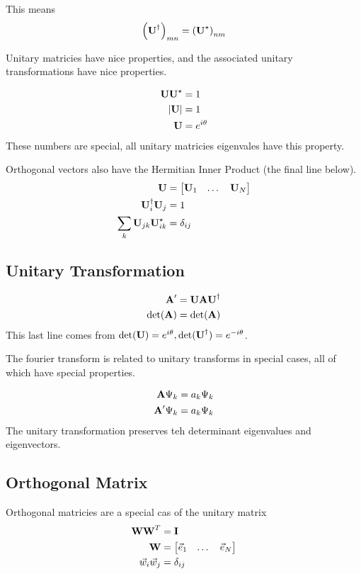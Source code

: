 \documentclass{article}
\newcommand{\be}{\begin{equation}}
\newcommand{\ee}{\end{equation}}
\newcommand{\dg}{\dagger}
\newcommand{\bA}{\mbox{\bf A}}
\newcommand{\bI}{\mbox{\bf I}}
\newcommand{\bU}{\mbox{\bf U}}
\newcommand{\bW}{\mbox{\bf W}}
\begin{document}
This means
\be
\left(\bU^\dg\right)_{mn} = \left(\bU^\star\right)_{nm}
\ee

Unitary matricies have nice properties, and the associated unitary transformations have nice properties. 

\be
\begin{split}
    \bU\bU^\star &= 1\\
    |\bU| &= 1\\
    \bU &= e^{i\theta}
\end{split}
\ee
These numbers are special, all unitary matricies eigenvales have this property. 

Orthogonal vectors also have the Hermitian Inner Product (the final line below).
\be
\begin{split}
    \bU &= \begin{bmatrix}
        \bU_1 & \dots  & \bU_N 
\end{bmatrix}\\
    \bU^\dg_i\bU_j&=1\\
    \sum_k\bU_{jk}\bU^\star_{ik}&=\delta_{ij}
\end{split}
\ee

\subsection{Unitary Transformation}
\be
\begin{split}
\bA' &= \bU\bA\bU^\dg\\
    \det(\bA) &= \det(\bA)
\end{split}
\ee
This last line comes from $\det(\bU)=e^{i\theta}, \det(\bU^\dg) = e^{-i\theta}$.

The fourier transform is related to unitary transforms in special cases, all of which have special properties. 

\be
\begin{split}
    \bA\Psi_k &= a_k\Psi_k\\
    \bA'\Psi_k &= a_k\Psi_k\\
\end{split}
\ee
The unitary transformation preserves teh determinant eigenvalues and eigenvectors.

\subsection*{Orthogonal Matrix}
Orthogonal matricies are a special cas of the unitary matrix
\be
\begin{split}
    \bW\bW^T&=\bI\\
    \bW &= \begin{bmatrix}
        \vec{e}_1 & \dots  & \vec{e}_N 
\end{bmatrix}\\
    \vec{w}_i\vec{w}_j &= \delta_{ij}
\end{split}
\ee
\end{document}
